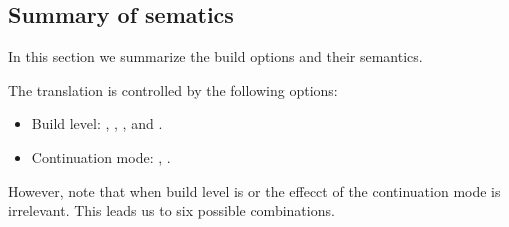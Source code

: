 \subsection{Summary of sematics}

In this section we summarize the build options and their semantics.

The translation is controlled by the following options:

\begin{itemize}
  \item Build level: , , , and .
  \item Continuation mode: , .
\end{itemize}

However, note that when build level is  or  the effecct of the
continuation mode is irrelevant. This leads us to six possible combinations.

